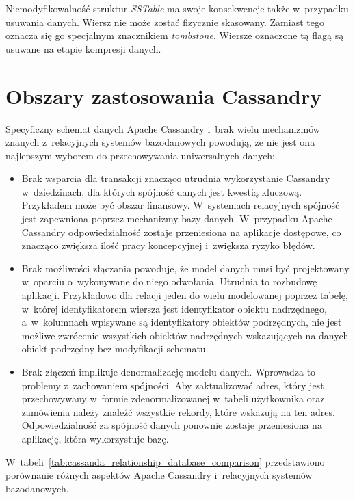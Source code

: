Niemodyfikowalność struktur \emph{SSTable} ma swoje konsekwencje także w~przypadku usuwania danych. Wiersz nie może zostać fizycznie skasowany. Zamiast tego oznacza się go specjalnym znacznikiem \emph{tombstone}. Wiersze oznaczone tą flagą są usuwane na etapie kompresji danych.

\section{Obszary zastosowania Cassandry}
\label{sec:cassandra_usage_areas}

Specyficzny schemat danych Apache Cassandry i~brak wielu mechanizmów znanych z~relacyjnych systemów bazodanowych powodują, że nie jest ona najlepszym wyborem do przechowywania uniwersalnych danych:

\begin{itemize}
	\item Brak wsparcia dla transakcji znacząco utrudnia wykorzystanie Cassandry w~dziedzinach, dla których spójność danych jest kwestią kluczową. Przykładem może być obszar finansowy. W~systemach relacyjnych spójność jest zapewniona poprzez mechanizmy bazy danych. W~przypadku Apache Cassandry odpowiedzialność zostaje przeniesiona na aplikacje dostępowe, co znacząco zwiększa ilość pracy koncepcyjnej i~zwiększa ryzyko błędów.
	\item Brak możliwości złączania powoduje, że model danych musi być projektowany w~oparciu o~wykonywane do niego odwołania. Utrudnia to rozbudowę aplikacji. Przykładowo dla relacji jeden do wielu modelowanej poprzez tabelę, w~której identyfikatorem wiersza jest identyfikator obiektu nadrzędnego, a~w~kolumnach wpisywane są identyfikatory obiektów podrzędnych, nie jest możliwe zwrócenie wszystkich obiektów nadrzędnych wskazujących na danych obiekt podrzędny bez modyfikacji schematu.
	\item Brak złączeń implikuje denormalizację modelu danych. Wprowadza to problemy z~zachowaniem spójności. Aby zaktualizować adres, który jest przechowywany w~formie zdenormalizowanej w~tabeli użytkownika oraz zamówienia należy znaleźć wszystkie rekordy, które wskazują na ten adres. Odpowiedzialność za spójność danych ponownie zostaje przeniesiona na aplikację, która wykorzystuje bazę.
\end{itemize}

W~tabeli~\ref{tab:cassanda_relationship_database_comparison} przedstawiono porównanie różnych aspektów Apache Cassandry i~relacyjnych systemów bazodanowych. 

